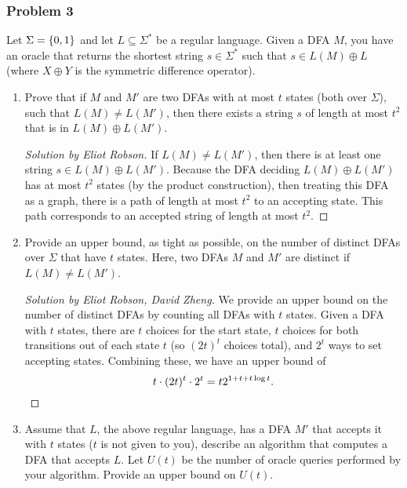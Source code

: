 \documentclass{article}
\newenvironment{solution}[1]{\begin{proof}[Solution by #1]}{\end{proof}}
\begin{document}
\subsubsection{Problem 3}
Let \(\Sigma = \set{0,1}\) and let \(L \subseteq \Sigma^*\) be a regular language. Given a DFA \(M\), you have an oracle that returns the shortest string \(s \in \Sigma^*\) such that \(s \in L(M) \oplus L\) (where \(X \oplus Y\) is the symmetric difference operator).

\begin{enumerate}
	\item Prove that if \(M\) and \(M'\) are two DFAs with at most \(t\) states (both over \(\Sigma\)), such that \(L(M) \neq L(M')\), then there exists a string \(s\) of length at most \(t^2\) that is in \(L(M) \oplus L(M')\).
	
	\begin{solution}{Eliot Robson}
		If \(L(M) \neq L(M')\), then there is at least one string \(s \in L(M) \oplus L(M')\). Because the DFA deciding \(L(M) \oplus L(M')\) has at most \(t^2\) states (by the product construction), then treating this DFA as a graph, there is a path of length at most \(t^2\) to an accepting state. This path corresponds to an accepted string of length at most \(t^2\).
	\end{solution}
	
	\item Provide an upper bound, as tight as possible, on the number of distinct DFAs over \(\Sigma\) that have \(t\) states. Here, two DFAs \(M\) and \(M'\) are distinct if \(L(M) \neq L(M')\).
    
    \begin{solution}{Eliot Robson, David Zheng}
        We provide an upper bound on the number of distinct DFAs by counting all DFAs with \(t\) states. Given a DFA with \(t\) states, there are \(t\) choices for the start state, \(t\) choices for both transitions out of each state \(t\) (so \((2t)^t\) choices total), and \(2^t\) ways to set accepting states. Combining these, we have an upper bound of
        \[
            t \cdot (2t)^t \cdot 2^t
            =%
            t 2^{1 + t + t \log t}. \qedhere
        \] 
    \end{solution}
	
	\item Assume that \(L\), the above regular language, has a DFA \(M'\) that accepts it with \(t\) states (\(t\) is not given to you), describe an algorithm that computes a DFA that accepts \(L\). Let \(U(t)\) be the number of oracle queries performed by your algorithm. Provide an upper bound on \(U(t)\).
	

\end{enumerate}
\end{document}
